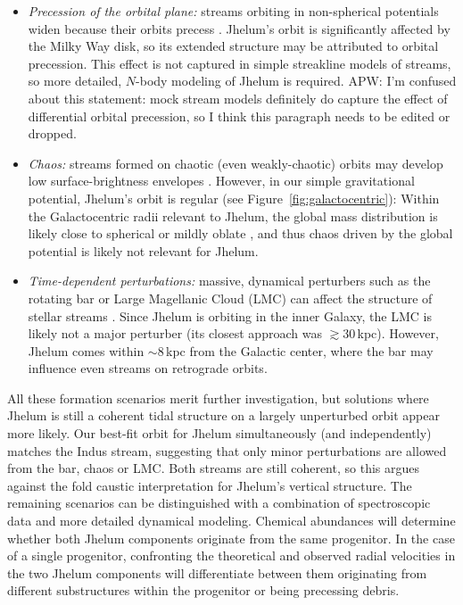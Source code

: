 \documentclass[twocolumn]{aastex62}
\newcommand{\apw}[1]{{\color{blue} APW: #1}}
\begin{document}
\begin{itemize}
{ Precise kinematics will test this formation pathway as well.
 }
 \item{\emph{Precession of the orbital plane:} streams orbiting in non-spherical potentials widen because their orbits precess \citep[e.g.,][]{erkal2016, dehnen2018}.
 Jhelum's orbit is significantly affected by the Milky Way disk, so its extended structure may be attributed to orbital precession.
 This effect is not captured in simple streakline models of streams, so more detailed, $N$-body modeling of Jhelum is required.
 \apw{I'm confused about this statement: mock stream models definitely do capture the effect of differential orbital precession, so I think this paragraph needs to be edited or dropped.}
 }
 \item{\emph{Chaos:} streams formed on chaotic (even weakly-chaotic) orbits may develop low surface-brightness envelopes \citep[e.g.,][]{pw2016}.
 However, in our simple gravitational potential, Jhelum's orbit is regular (see Figure~\ref{fig:galactocentric}):
 Within the Galactocentric radii relevant to Jhelum, the global mass distribution is likely close to spherical or mildly oblate \citep[e.g.,][]{kupper2015}, and thus chaos driven by the global potential is likely not relevant for Jhelum.
 }
 \item{\emph{Time-dependent perturbations:} massive, dynamical perturbers such as the rotating bar or Large Magellanic Cloud (LMC) can affect the structure of stellar streams \citep[e.g.,][]{pw2016b, pearson2017, erkal2019}.
 Since Jhelum is orbiting in the inner Galaxy, the LMC is likely not a major perturber (its closest approach was $\gtrsim30$\,kpc).
 However, Jhelum comes within $\sim8\,$kpc from the Galactic center, where the bar may influence even streams on retrograde orbits.
 }
\end{itemize}

All these formation scenarios merit further investigation, but solutions where Jhelum is still a coherent tidal structure on a largely unperturbed orbit appear more likely.
Our best-fit orbit for Jhelum simultaneously (and independently) matches the Indus stream, suggesting that only minor perturbations are allowed from the bar, chaos or LMC.
Both streams are still coherent, so this argues against the fold caustic interpretation for Jhelum's vertical structure.
The remaining scenarios can be distinguished with a combination of spectroscopic data and more detailed dynamical modeling.
Chemical abundances will determine whether both Jhelum components originate from the same progenitor.
In the case of a single progenitor, confronting the theoretical and observed radial velocities in the two Jhelum components will differentiate between them originating from different substructures within the progenitor or being precessing debris.
\end{document}
